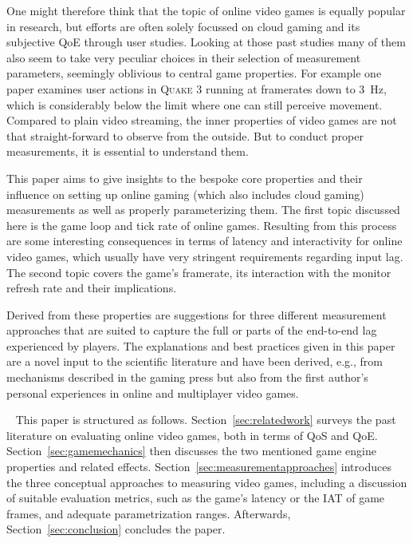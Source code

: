One might therefore think that the topic of online video games is 
equally popular in research, but efforts are often solely focussed on 
cloud gaming and its subjective \gls{QoE} through user studies. Looking 
at those past studies many of them also seem to take very peculiar 
choices in their selection of measurement parameters, seemingly 
oblivious to central game properties. For example one paper 
\cite{claypool2007} examines user actions in \textsc{Quake 3} running 
at framerates down to \SI{3}{\hertz}, which is considerably below the 
limit where one can still perceive movement. Compared to plain video 
streaming, the inner properties of video games are not that 
straight-forward to observe from the outside. But to conduct proper 
measurements, it is essential to understand them. 


This paper aims to give insights to the bespoke core properties and 
their influence on setting up online gaming (which also includes cloud 
gaming) measurements as well as properly parameterizing them. The first 
topic discussed here is the game loop and tick rate of online games. 
Resulting from this process are some interesting consequences in terms 
of latency and interactivity for online video games, which usually have 
very stringent requirements regarding input lag. 
The second topic covers the game's framerate, its interaction with the 
monitor refresh rate and their implications.

Derived from these properties are suggestions for three different 
measurement approaches that are suited to capture the full or parts of 
the end-to-end lag experienced by players. The explanations and best 
practices given in this paper are a novel input to the scientific 
literature and have been derived, e.g., from mechanisms described in 
the gaming press but also from the first author's personal experiences 
in online and multiplayer video games.

~\newline
This paper is structured as follows. Section~\ref{sec:relatedwork} 
surveys the past literature on evaluating online video games, both in 
terms of \gls{QoS} and \gls{QoE}. Section~\ref{sec:gamemechanics} then 
discusses the two mentioned game engine properties and related effects. 
Section~\ref{sec:measurementapproaches} introduces the three conceptual 
approaches to measuring video games, including a discussion of suitable 
evaluation metrics, such as the game's latency or the \gls{IAT} of game 
frames, and adequate parametrization ranges. Afterwards, 
Section~\ref{sec:conclusion} concludes the paper.


